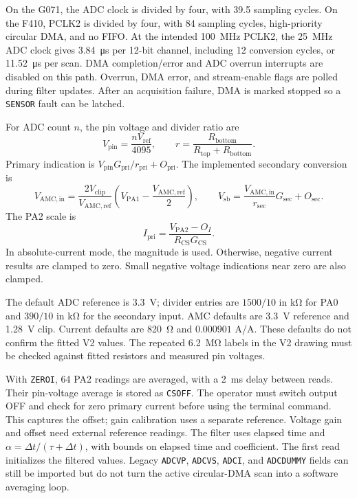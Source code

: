 On the G071, the ADC clock is divided by four, with 39.5 sampling cycles. On the F410, PCLK2 is divided by four, with 84 sampling cycles, high-priority circular DMA, and no FIFO. At the intended \SI{100}{\mega\hertz} PCLK2, the \SI{25}{\mega\hertz} ADC clock gives \SI{3.84}{\micro\second} per 12-bit channel, including 12 conversion cycles, or \SI{11.52}{\micro\second} per scan. DMA completion/error and ADC overrun interrupts are disabled on this path. Overrun, DMA error, and stream-enable flags are polled during filter updates. After an acquisition failure, DMA is marked stopped so a \texttt{SENSOR} fault can be latched.

For ADC count \(n\), the pin voltage and divider ratio are
\begin{equation}
 V_{\mathrm{pin}}=\frac{nV_{\mathrm{ref}}}{4095},
 \qquad
 r=\frac{R_{\mathrm{bottom}}}{R_{\mathrm{top}}+R_{\mathrm{bottom}}}.
 \label{eq:app-fw-adc-scale}
\end{equation}
Primary indication is \(V_{\mathrm{pin}}G_{\mathrm{pri}}/r_{\mathrm{pri}}+O_{\mathrm{pri}}\). The implemented secondary conversion is
\begin{equation}
 V_{\mathrm{AMC,in}}=
 \frac{2V_{\mathrm{clip}}}{V_{\mathrm{AMC,ref}}}
 \left(V_{\mathrm{PA1}}-\frac{V_{\mathrm{AMC,ref}}}{2}\right),
 \qquad
 V_{\mathrm{sb}}=\frac{V_{\mathrm{AMC,in}}}{r_{\mathrm{sec}}}G_{\mathrm{sec}}+O_{\mathrm{sec}}.
 \label{eq:app-fw-amc-scale}
\end{equation}
The PA2 scale is
\begin{equation}
 I_{\mathrm{pri}}=
 \frac{V_{\mathrm{PA2}}-O_I}{R_{\mathrm{CS}}G_{\mathrm{CS}}}.
 \label{eq:app-fw-current-scale}
\end{equation}
In absolute-current mode, the magnitude is used. Otherwise, negative current results are clamped to zero. Small negative voltage indications near zero are also clamped.

The default ADC reference is \SI{3.3}{\volt}; divider entries are \(1500/10\) in \si{\kilo\ohm} for PA0 and \(390/10\) in \si{\kilo\ohm} for the secondary input. AMC defaults are \SI{3.3}{\volt} reference and \SI{1.28}{\volt} clip. Current defaults are \SI{820}{\ohm} and \(0.000901\) A/A. These defaults do not confirm the fitted V2 values. The repeated \SI{6.2}{\mega\ohm} labels in the V2 drawing must be checked against fitted resistors and measured pin voltages.

With \texttt{ZEROI}, 64 PA2 readings are averaged, with a \SI{2}{\milli\second} delay between reads. Their pin-voltage average is stored as \texttt{CSOFF}. The operator must switch output OFF and check for zero primary current before using the terminal command. This captures the offset; gain calibration uses a separate reference. Voltage gain and offset need external reference readings. The filter uses elapsed time and \(\alpha=\Delta t/(\tau+\Delta t)\), with bounds on elapsed time and coefficient. The first read initializes the filtered values. Legacy \texttt{ADCVP}, \texttt{ADCVS}, \texttt{ADCI}, and \texttt{ADCDUMMY} fields can still be imported but do not turn the active circular-DMA scan into a software averaging loop.

